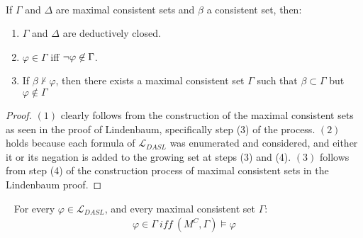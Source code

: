 \begin{lemma}[Properties]~\label{properties}

If $\Gamma$ and $\Delta$ are maximal consistent sets and $\beta$ a consistent set, then:
\begin{enumerate}
	\item $\Gamma$ and $\Delta$ are deductively closed.
	\item $\varphi \in \Gamma$ iff ${\neg} \varphi \not\in \Gamma$.
    \item If $\beta \not \vdash \varphi$, then there exists a maximal consistent set $\Gamma$ such that $\beta \subset \Gamma$ but $\varphi \not \in \Gamma$
\end{enumerate}
\end{lemma}
\begin{proof}
	$(1)$ clearly follows from the construction of the maximal consistent sets as seen in the proof of Lindenbaum, specifically step (3) of the process. $(2)$ holds because each formula of $\mathcal{L}_{DASL}$ was enumerated and considered, and either it or its negation is added to the growing set at steps (3) and (4). $(3)$ follows from step (4) of the construction process of maximal consistent sets in the Lindenbaum proof.  
\end{proof}
\begin{lemma}[Truth]~\label{truth}
For every $\varphi \in \mathcal{L}_{DASL}$, and every maximal consistent set $\Gamma$:
\begin{eqnarray*}
	\varphi \in \Gamma \ \mathit{iff}\ (M^C,\Gamma)\models\varphi
\end{eqnarray*}
\end{lemma}

